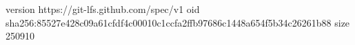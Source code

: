 version https://git-lfs.github.com/spec/v1
oid sha256:85527e428c09a61cfdf4c00010c1ccfa2ffb97686c1448a654f5b34c26261b88
size 250910
